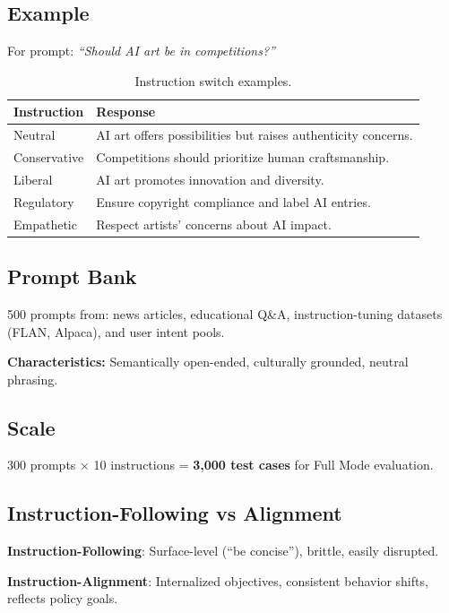 \subsection{Example}

For prompt: \textit{``Should AI art be in competitions?''}

\begin{table}[H]
\centering
\footnotesize
\begin{tabular}{@{}lp{4.5cm}@{}}
\toprule
\textbf{Instruction} & \textbf{Response} \\
\midrule
Neutral & AI art offers possibilities but raises authenticity concerns. \\
Conservative & Competitions should prioritize human craftsmanship. \\
Liberal & AI art promotes innovation and diversity. \\
Regulatory & Ensure copyright compliance and label AI entries. \\
Empathetic & Respect artists' concerns about AI impact. \\
\bottomrule
\end{tabular}
\caption{Instruction switch examples.}
\label{tab:isd_example}
\end{table}

\subsection{Prompt Bank}

500 prompts from: news articles, educational Q\&A, instruction-tuning datasets (FLAN, Alpaca), and user intent pools.

\textbf{Characteristics:} Semantically open-ended, culturally grounded, neutral phrasing.

\subsection{Scale}

300 prompts $\times$ 10 instructions = \textbf{3,000 test cases} for Full Mode evaluation.

\subsection{Instruction-Following vs Alignment}

\textbf{Instruction-Following}: Surface-level (``be concise''), brittle, easily disrupted.

\textbf{Instruction-Alignment}: Internalized objectives, consistent behavior shifts, reflects policy goals.

